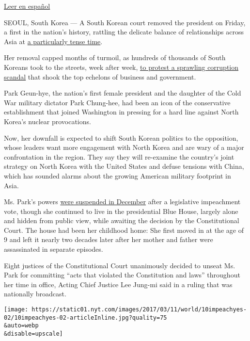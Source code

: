 \href{https://www.nytimes.com/es/2017/03/10/corea-del-sur-destituye-a-su-presidenta-y-se-reconfigura-el-panorama-politico-en-asia/}{Leer
en español}

SEOUL, South Korea --- A South Korean court removed the president on
Friday, a first in the nation's history, rattling the delicate balance
of relationships across Asia at
\href{https://www.nytimes.com/2017/03/07/world/asia/thaad-missile-defense-us-south-korea-china.html}{a
particularly tense time}.

Her removal capped months of turmoil, as hundreds of thousands of South
Koreans took to the streets, week after week,
\href{https://www.nytimes.com/2016/11/26/world/asia/korea-park-geun-hye-protests.html}{to
protest a sprawling corruption scandal} that shook the top echelons of
business and government.

Park Geun-hye, the nation's first female president and the daughter of
the Cold War military dictator Park Chung-hee, had been an icon of the
conservative establishment that joined Washington in pressing for a hard
line against North Korea's nuclear provocations.

Now, her downfall is expected to shift South Korean politics to the
opposition, whose leaders want more engagement with North Korea and are
wary of a major confrontation in the region. They say they will
re-examine the country's joint strategy on North Korea with the United
States and defuse tensions with China, which has sounded alarms about
the growing American military footprint in Asia.

Ms. Park's powers
\href{https://www.nytimes.com/2016/12/09/world/asia/south-korea-president-park-geun-hye-impeached.html}{were
suspended in December} after a legislative impeachment vote, though she
continued to live in the presidential Blue House, largely alone and
hidden from public view, while awaiting the decision by the
Constitutional Court. The house had been her childhood home: She first
moved in at the age of 9 and left it nearly two decades later after her
mother and father were assassinated in separate episodes.

Eight justices of the Constitutional Court unanimously decided to unseat
Ms. Park for committing ``acts that violated the Constitution and laws''
throughout her time in office, Acting Chief Justice Lee Jung-mi said in
a ruling that was nationally broadcast.

\texttt{[image: https://static01.nyt.com/images/2017/03/11/world/10impeachyes-02/10impeachyes-02-articleInline.jpg?quality=75\\\&auto=webp\\\&disable=upscale]}

